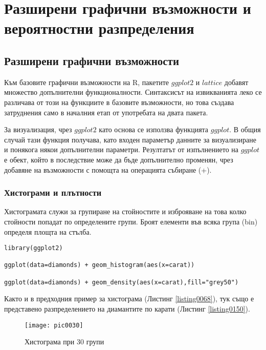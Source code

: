 ﻿\newpage
\chapter{Разширени графични възможности и вероятностни разпределения}
\label{chapter08}
\thispagestyle{empty}

\section{Разширени графични възможности}

Към базовите графични възможности на R, пакетите $ggplot2$ и $lattice$ добавят множество допълнителни функционалности. Синтаксисът на извикванията леко се различава от този на функциите в базовите възможности, но това създава затруднения само в началния етап от употребата на двата пакета. 

За визуализация, чрез $ggplot2$ като основа се използва функцията $ggplot$. В общия случай тази функция получава, като входен параметър данните за визуализиране и понякога някои допълнителни параметри. Резултатът от изпълнението на $ggplot$ е обект, който в последствие може да бъде допълнително променян, чрез добавяне на възможности с помощта на операцията събиране (+). 

\subsection{Хистограми и плътности}

Хистограмата служи за групиране на стойностите и изброяване на това колко стойности попадат по определените групи. Броят елементи във всяка група (bin) определя площта на стълба. 

\begin{lstlisting}[caption=Хистограма и плътност, label=listing0150]
library(ggplot2)

ggplot(data=diamonds) + geom_histogram(aes(x=carat))

ggplot(data=diamonds) + geom_density(aes(x=carat),fill="grey50")
\end{lstlisting}

Както и в предходния пример за хистограма (Листинг \ref{listing0068}), тук също е представено разпределението на диамантите по карати (Листинг \ref{listing0150}).

\begin{figure}[h!]
  \centering
  \texttt{[image: pic0030]}
  \caption{Хистограма при 30 групи}
\label{figure0030}
\end{figure}
\FloatBarrier

